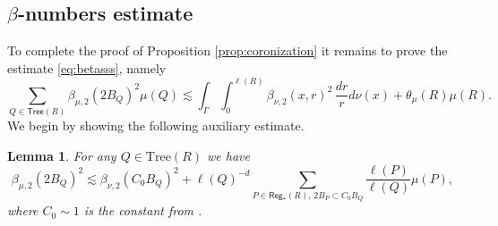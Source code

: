 \documentclass[11pt,reqno]{amsart}
\newcommand{\Tr}{\mathrm{Tree}}
\newcommand{\Tree}{\mathsf{Tree}}
\newcommand{\fr}[2]{\frac{#1}{#2}}
\newtheorem{lemma}[theorem]{Lemma}
\theoremstyle{definition}
\theoremstyle{remark}
\numberwithin{equation}{section}
\newcommand{\Reg}{\mathsf{Reg}_*}
\theoremstyle{theorem}
\theoremstyle{definition}
\theoremstyle{remark}
\numberwithin{equation}{section}
\begin{document}
    \subsection{$\beta$-numbers estimate}
    To complete the proof of Proposition \ref{prop:coronization} it remains to prove the estimate \eqref{eq:betasss}, namely
    \begin{equation*}
            \sum_{Q\in\Tree(R)}\beta_{\mu,2}(2B_Q)^2\mu(Q)\lesssim \int_{\Gamma}\int_0^{\ell(R)} \beta_{\nu,2}(x,r)^2\, \fr{dr}{r}d\nu(x) + \theta_\mu(R)\mu(R).
        \end{equation*}
    We begin by showing the following auxiliary estimate.
    \begin{lemma}
		For any $Q\in\Tr(R)$ we have
		\begin{equation}\label{eq:betaestmu}
			\beta_{\mu,2}(2B_Q)^2\lesssim \beta_{\nu,2}(C_0B_Q)^2 + \ell(Q)^{-d}\sum_{P\in\Reg(R),\, 2B_P\subset C_0B_Q} \fr{\ell(P)}{\ell(Q)}\mu(P),
		\end{equation}
		where $C_0\sim 1$ is the constant from .
	\end{lemma}
\end{document}
